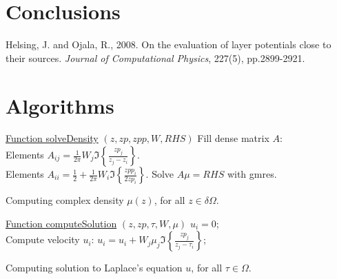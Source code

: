 \documentclass[a4paper,10pt]{article}
\begin{document}
\section*{Conclusions}

\newpage
\begin{thebibliography}{99}
    Helsing, J. and Ojala, R., 2008. On the evaluation of layer potentials close to their sources. {\em Journal of Computational Physics}, 227(5), pp.2899-2921.
\end{thebibliography}

\newpage
\appendix
\section{Algorithms}
\label{sec:alg}
\begin{algorithm}[ht]

    \underline{Function solveDensity} $(z,zp,zpp,W, RHS)$\;
    \Output{$\mu$}
     {
         {
            Fill dense matrix $A$: \\
                Elements $A_{ij} = \frac{1}{2\pi} W_j \Im\left\{ \frac{zp_j}{z_j - z_i} \right\}$. \\
                Elements $A_{ii} = \frac{1}{2} + \frac{1}{2\pi}W_i \Im\left\{ \frac{zpp_i}{2zp_i} \right\}$.
        }
    }
    Solve $A\mu=RHS$ with gmres.
    \caption{Computing complex density $\mu(z)$, for all $z\in\delta\Omega$.}
    \label{alg:solveDensity}
\end{algorithm}
\begin{algorithm}[ht]

    \underline{Function computeSolution} $(z,zp,\tau,W,\mu)$\;
     {
        $u_i = 0$; \\
         {
            Compute velocity $u_i$: 
            $u_i = u_i + W_j\mu_j\Im\left\{ \frac{zp_j}{z_j-\tau_i} \right\}$;
        }
    }
    \caption{Computing solution to Laplace's equation $u$, for all $\tau\in\Omega$.}
    \label{alg:compU}
\end{algorithm}
\end{document}
